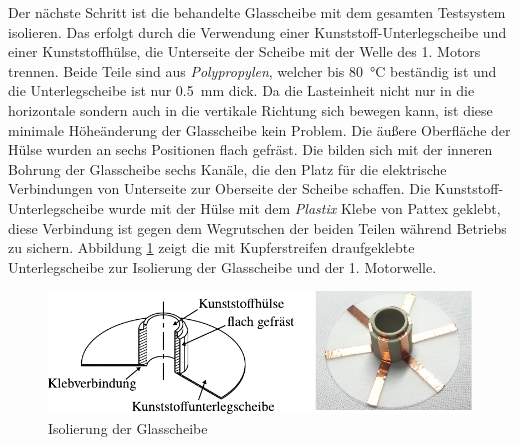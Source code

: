Der nächste Schritt ist die behandelte Glasscheibe mit dem gesamten Testsystem isolieren.
Das erfolgt durch die Verwendung einer Kunststoff-Unterlegscheibe und einer Kunststoffhülse, die Unterseite der Scheibe mit der Welle des 1. Motors trennen.
Beide Teile sind aus \textit{Polypropylen}, welcher bis \SI{80}{\degreeCelsius} beständig ist und die Unterlegscheibe ist nur \SI{0.5}{\milli\meter} dick.
Da die Lasteinheit nicht nur in die horizontale sondern auch in die vertikale Richtung sich bewegen kann, ist diese minimale Höheänderung der Glasscheibe kein Problem.
Die äußere Oberfläche der Hülse wurden an sechs Positionen flach gefräst. Die bilden sich mit der inneren Bohrung der Glasscheibe sechs Kanäle, die den Platz für die elektrische Verbindungen von Unterseite zur Oberseite der Scheibe schaffen.
Die Kunststoff-Unterlegscheibe wurde mit der Hülse mit dem \textit{Plastix} Klebe von Pattex geklebt, diese Verbindung ist gegen dem Wegrutschen der beiden Teilen während Betriebs zu sichern.
Abbildung \ref{fig:isolierung_der_glassscheibe} zeigt die mit Kupferstreifen draufgeklebte Unterlegscheibe zur Isolierung der Glasscheibe und der 1. Motorwelle.
\begin{figure}[htb]
    \centering
    \includegraphics[]{./images/isolierung_der_scheibe.pdf}
    \caption{Isolierung der Glasscheibe}
    \label{fig:isolierung_der_glassscheibe}
\end{figure}
%

